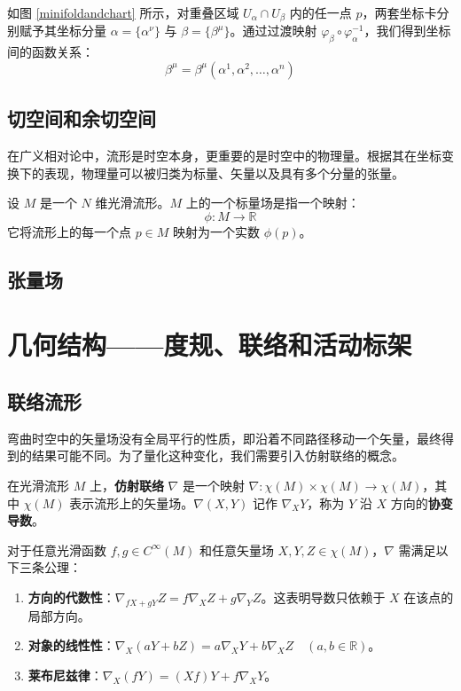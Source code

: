 如图 \ref{minifoldandchart} 所示，对重叠区域 $U_\alpha \cap U_\beta$ 内的任一点 $p$，两套坐标卡分别赋予其坐标分量 $\alpha = \{\alpha^\nu\}$ 与 $\beta = \{\beta^\mu\}$。通过过渡映射 $\varphi_\beta \circ \varphi_\alpha^{-1}$，我们得到坐标间的函数关系：$$\beta^\mu = \beta^\mu(\alpha^1, \alpha^2, \dots, \alpha^n)$$
\subsection{切空间和余切空间}
在广义相对论中，流形是时空本身，更重要的是时空中的物理量。根据其在坐标变换下的表现，物理量可以被归类为标量、矢量以及具有多个分量的张量。
\begin{definition}[标量场]
设 $M$ 是一个 $N$ 维光滑流形。$M$ 上的一个标量场是指一个映射：
$$ \phi: M \to \mathbb{R} $$
它将流形上的每一个点 $p \in M$ 映射为一个实数 $\phi(p)$。
\end{definition}
\subsection{张量场}
\newpage

\section{几何结构——度规、联络和活动标架}
\subsection{联络流形}
弯曲时空中的矢量场没有全局平行的性质，即沿着不同路径移动一个矢量，最终得到的结果可能不同。为了量化这种变化，我们需要引入仿射联络的概念。

\begin{definition}[仿射联络]
    在光滑流形 $M$ 上，\textbf{仿射联络} $\nabla$ 是一个映射 $\nabla: \mathfrak{\chi}(M) \times \mathfrak{\chi}(M) \to \mathfrak{\chi}(M)$，其中 $\mathfrak{\chi}(M)$ 表示流形上的矢量场。$\nabla(X, Y)$ 记作 $\nabla_X Y$，称为 $Y$ 沿 $X$ 方向的\textbf{协变导数}。
    
    对于任意光滑函数 $f, g \in C^\infty(M)$ 和任意矢量场 $X, Y, Z \in \mathfrak{\chi}(M)$，$\nabla$ 需满足以下三条公理：
    \begin{enumerate}
        \item \textbf{方向的代数性}：$\nabla_{fX + gY} Z = f\nabla_X Z + g\nabla_Y Z $。这表明导数只依赖于 $X$ 在该点的局部方向。
        \item \textbf{对象的线性性}：$ \nabla_X (aY + bZ) = a\nabla_X Y + b\nabla_X Z \quad (a, b \in \mathbb{R}) $。
        \item \textbf{莱布尼兹律}：$ \nabla_X (fY) = (Xf)Y + f\nabla_X Y $。
    \end{enumerate}
\end{definition}

